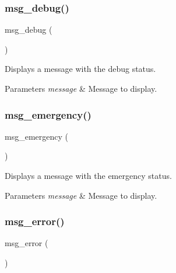 \subsubsection{\texorpdfstring{msg\+\_\+debug()}{msg\_debug()}}
{\footnotesize\ttfamily msg\+\_\+debug (\begin{DoxyParamCaption}\item[{message}]{ }\end{DoxyParamCaption})}



Displays a message with the \textquotesingle{}debug\textquotesingle{} status. 


\begin{DoxyParams}{Parameters}
{\em message} & Message to display. \\
\hline
\end{DoxyParams}
\mbox{\label{group__message_ga3b4d3c652e7fdb3189a738a6cb1a99fd}} 
\subsubsection{\texorpdfstring{msg\+\_\+emergency()}{msg\_emergency()}}
{\footnotesize\ttfamily msg\+\_\+emergency (\begin{DoxyParamCaption}\item[{message}]{ }\end{DoxyParamCaption})}



Displays a message with the \textquotesingle{}emergency\textquotesingle{} status. 


\begin{DoxyParams}{Parameters}
{\em message} & Message to display. \\
\hline
\end{DoxyParams}
\mbox{\label{group__message_ga8fead3d7c844b6cfed0ca5ef0d930565}} 
\subsubsection{\texorpdfstring{msg\+\_\+error()}{msg\_error()}}
{\footnotesize\ttfamily msg\+\_\+error (\begin{DoxyParamCaption}\item[{message}]{ }\end{DoxyParamCaption})}



